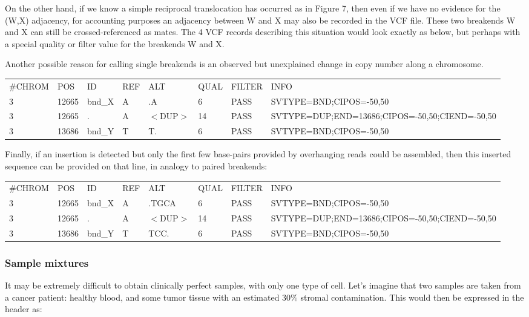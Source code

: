 \documentclass[8pt]{article}
\begin{document}
On the other hand, if we know a simple reciprocal translocation has occurred as in Figure 7, then even if we have no evidence for the (W,X) adjacency, for accounting purposes an adjacency between W and X may also be recorded in the VCF file.
These two breakends W and X can still be crossed-referenced as mates.
The 4 VCF records describing this situation would look exactly as below, but perhaps with a special quality or filter value for the breakends W and X.

Another possible reason for calling single breakends is an observed but unexplained change in copy number along a chromosome.

\vspace{0.3cm}
\scriptsize
\begin{tabular}{ l l l l l l l l }
\#CHROM & POS & ID & REF & ALT & QUAL & FILTER & INFO \\
3 & 12665 & bnd\_X & A & .A & 6 & PASS & SVTYPE=BND;CIPOS=-50,50 \\
3 & 12665 & . & A & $<$DUP$>$ & 14 & PASS & SVTYPE=DUP;END=13686;CIPOS=-50,50;CIEND=-50,50 \\
3 & 13686 & bnd\_Y & T & T. & 6 & PASS & SVTYPE=BND;CIPOS=-50,50 \\
\end{tabular}
\normalsize
\vspace{0.3cm}

Finally, if an insertion is detected but only the first few base-pairs provided by overhanging reads could be assembled, then this inserted sequence can be provided on that line, in analogy to paired breakends:

\vspace{0.3cm}
\scriptsize
\begin{tabular}{ l l l l l l l l }
\#CHROM & POS & ID & REF & ALT & QUAL & FILTER & INFO \\
3 & 12665 & bnd\_X & A & .TGCA & 6 & PASS & SVTYPE=BND;CIPOS=-50,50 \\
3 & 12665 & . & A & $<$DUP$>$ & 14 & PASS & SVTYPE=DUP;END=13686;CIPOS=-50,50;CIEND=-50,50 \\
3 & 13686 & bnd\_Y & T & TCC. & 6 & PASS & SVTYPE=BND;CIPOS=-50,50 \\
\end{tabular}
\normalsize

\subsubsection{Sample mixtures}
It may be extremely difficult to obtain clinically perfect samples, with only one type of cell.
Let's imagine that two samples are taken from a cancer patient: healthy blood, and some tumor tissue with an estimated 30\% stromal contamination.
This would then be expressed in the header as:
\end{document}
